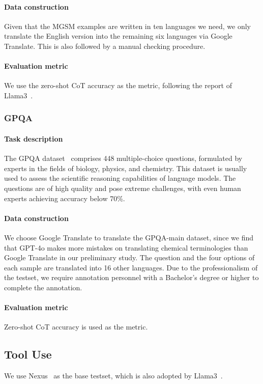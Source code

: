 \paragraph{Data construction}
Given that the MGSM examples are written in ten languages we need, we only translate the English version into the remaining six languages via Google Translate.
This is also followed by a manual checking procedure.

\paragraph{Evaluation metric}
We use the zero-shot CoT accuracy as the metric, following the report of Llama3~\cite{dubey2024llama}.

\subsubsection{GPQA}
\paragraph{Task description}
The GPQA dataset~\cite{Rein2023GPQAAG} comprises 448 multiple-choice questions, formulated by experts in the fields of biology, physics, and chemistry.
This dataset is usually used to assess the scientific reasoning capabilities of language models.
The questions are of high quality and pose extreme challenges, with even human experts achieving accuracy below 70\%.

\paragraph{Data construction}
We choose Google Translate to translate the GPQA-main dataset, since we find that GPT-4o makes more mistakes on translating chemical terminologies than Google Translate in our preliminary study.
The question and the four options of each sample are translated into 16 other languages.
Due to the professionalism of the testset, we require annotation personnel with a Bachelor's degree or higher to complete the annotation.

\paragraph{Evaluation metric}
Zero-shot CoT accuracy is used as the metric.

\subsection{Tool Use}
We use Nexus~\cite{srinivasan2023nexusraven} as the base testset, which is also adopted by Llama3~\cite{dubey2024llama}.

